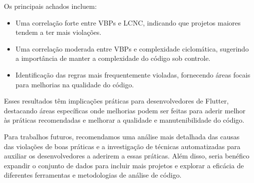 \documentclass[12pt]{article}
\begin{document}
Os principais achados incluem:
\begin{itemize}
    \item Uma correlação forte entre VBPs e LCNC, indicando que projetos maiores tendem a ter mais violações.
    \item Uma correlação moderada entre VBPs e complexidade ciclomática, sugerindo a importância de manter a complexidade do código sob controle.
    \item Identificação das regras mais frequentemente violadas, fornecendo áreas focais para melhorias na qualidade do código.
\end{itemize}

Esses resultados têm implicações práticas para desenvolvedores de Flutter, destacando áreas específicas onde melhorias podem ser feitas para aderir melhor às práticas recomendadas e melhorar a qualidade e manutenibilidade do código.

Para trabalhos futuros, recomendamos uma análise mais detalhada das causas das violações de boas práticas e a investigação de técnicas automatizadas para auxiliar os desenvolvedores a aderirem a essas práticas. Além disso, seria benéfico expandir o conjunto de dados para incluir mais projetos e explorar a eficácia de diferentes ferramentas e metodologias de análise de código.



\end{document}
